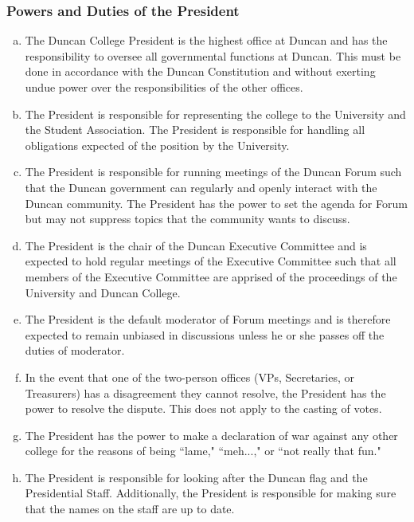 \documentclass[USletter,12pt]{article}
\begin{document}
\begin{enumerate}[(a)]
\subsubsection{Powers and Duties of the President}
\begin{enumerate}[(a)]
\item The Duncan College President is the highest office at Duncan and has the responsibility to oversee all governmental functions at Duncan.  This must be done in accordance with the Duncan Constitution and without exerting undue power over the responsibilities of the other offices.
\item The President is responsible for representing the college to the University and the Student Association. The President is responsible for handling all obligations expected of the position by the University.  
\item The President is responsible for running meetings of the Duncan Forum such that the Duncan government can regularly and openly interact with the Duncan community.  The President has the power to set the agenda for Forum but may not suppress topics that the community wants to discuss.
\item The President is the chair of the Duncan Executive Committee and is expected to hold regular meetings of the Executive Committee such that all members of the Executive Committee are apprised of the proceedings of the University and Duncan College.
\item The President is the default moderator of Forum meetings and is therefore expected to remain unbiased in discussions unless he or she passes off the duties of moderator.
\item In the event that one of the two-person offices (VPs, Secretaries, or Treasurers) has a disagreement they cannot resolve, the President has the power to resolve the dispute.  This does not apply to the casting of votes.
\item The President has the power to make a declaration of war against any other college for the reasons of being ``lame," ``meh...," or ``not really that fun."
\item The President is responsible for looking after the Duncan flag and the Presidential Staff.  Additionally, the President is responsible for making sure that the names on the staff are up to date.
\end{enumerate}


\end{enumerate}
\end{document}
